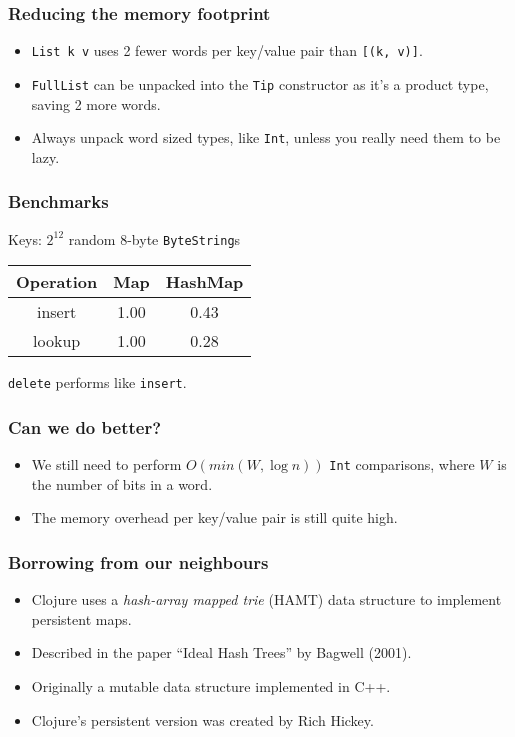 \documentclass{beamer}
\begin{document}
\begin{frame}
  \frametitle{Reducing the memory footprint}
  \begin{itemize}
  \item \lstinline!List k v! uses 2 fewer words per key/value pair
    than \lstinline![(k, v)]!.
  \item \lstinline!FullList! can be unpacked into the \lstinline!Tip!
    constructor as it's a product type, saving 2 more words.
  \item Always unpack word sized types, like \lstinline!Int!, unless
    you really need them to be lazy.
  \end{itemize}
\end{frame}

\begin{frame}
  \frametitle{Benchmarks}

  Keys: $2^{12}$ random 8-byte \lstinline!ByteString!s

  \bigskip
  \begin{tabular}{|c|c|c|}
    \hline \textbf{Operation} & \textbf{Map} & \textbf{HashMap} \\
    \hline insert & 1.00 & 0.43 \\
    \hline lookup & 1.00 & 0.28 \\
    \hline
  \end{tabular}
  \bigskip

  \lstinline!delete! performs like \lstinline!insert!.
\end{frame}

\begin{frame}
  \frametitle{Can we do better?}
  \begin{itemize}
  \item We still need to perform $O(min(W, \log n))$ \lstinline!Int!
    comparisons, where $W$ is the number of bits in a word.
  \item The memory overhead per key/value pair is still quite high.
  \end{itemize}
\end{frame}

\begin{frame}
  \frametitle{Borrowing from our neighbours}
  \begin{itemize}
  \item Clojure uses a \emph{hash-array mapped trie} (HAMT) data
    structure to implement persistent maps.
  \item Described in the paper ``Ideal Hash Trees'' by Bagwell (2001).
  \item Originally a mutable data structure implemented in C++.
  \item Clojure's persistent version was created by Rich Hickey.
  \end{itemize}
\end{frame}
\end{document}

